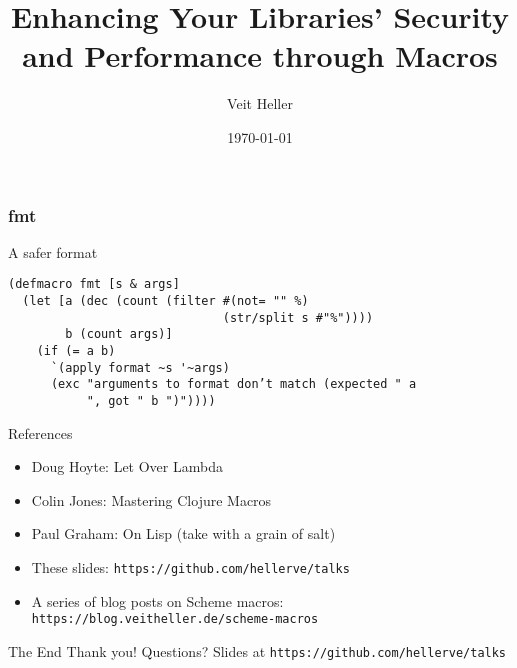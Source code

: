 \documentclass[aspectratio=169]{beamer}
\title{Enhancing Your Libraries’ Security and Performance through Macros}
\date{\today}
\author{Veit Heller}
\institute{Clojure Meetup Berlin}
\begin{document}
  \maketitle
  \begin{frame}[fragile]
    \frametitle{fmt}
    \begin{listing}[H]
      \caption{A safer format}
      \begin{verbatim}
(defmacro fmt [s & args]
  (let [a (dec (count (filter #(not= "" %)
                              (str/split s #"%"))))
        b (count args)]
    (if (= a b)
      `(apply format ~s '~args)
      (exc "arguments to format don’t match (expected " a
           ", got " b ")"))))
      \end{verbatim}
    \end{listing}
  \end{frame}
  \begin{frame}{References}
    \begin{itemize}
      \item Doug Hoyte: Let Over Lambda
      \item Colin Jones: Mastering Clojure Macros
      \item Paul Graham: On Lisp (take with a grain of salt)
      \item These slides: \texttt{https://github.com/hellerve/talks}
      \item A series of blog posts on Scheme macros: \texttt{https://blog.veitheller.de/scheme-macros}
    \end{itemize}
  \end{frame}
  \begin{frame}{The End}
    \Huge Thank you!
    \linebreak
    \linebreak
    \linebreak
    \small Questions?
    \linebreak
    \linebreak
    \tiny Slides at \texttt{https://github.com/hellerve/talks}
  \end{frame}
\end{document}
